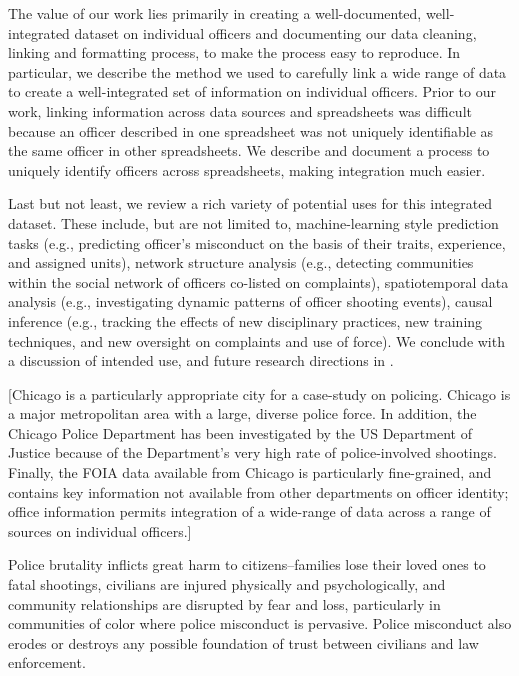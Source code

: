 The value of our work lies primarily in creating a well-documented,
well-integrated dataset on individual officers and documenting our data
cleaning, linking and formatting process, to make the process easy to
reproduce. In particular, we describe the method we used to carefully link
a wide range of data to create a well-integrated set of information on
individual officers. Prior to our work, linking information across data sources
and spreadsheets was difficult because an officer described in one spreadsheet
was not uniquely identifiable as the same officer in other spreadsheets. We
describe and document a process to uniquely identify officers across
spreadsheets, making integration much easier.

Last but not least, we review a rich variety of potential uses for this
integrated dataset. These include, but are not limited to, machine-learning
style prediction tasks (e.g., predicting officer's misconduct on the basis of
their traits, experience, and assigned units), network structure analysis
(e.g., detecting communities within the social network of officers co-listed on
complaints), spatiotemporal data analysis (e.g., investigating dynamic patterns
of officer shooting events), causal inference (e.g., tracking the effects of
new disciplinary practices, new training techniques, and new oversight on
complaints and use of force). We conclude with a discussion of intended use,
and future research directions in .

[Chicago is a particularly appropriate city for a case-study on policing.
Chicago is a major metropolitan area with a large, diverse police force. In
addition, the Chicago Police Department has been investigated by the US
Department of Justice because of the Department’s very high rate of
police-involved shootings. Finally, the FOIA data available from Chicago is
particularly fine-grained, and contains key information not available from
other departments on officer identity; office information permits integration
of a wide-range of data across a range of sources on individual officers.]

\iffalse
Police brutality inflicts great harm to citizens--families lose their loved
ones to fatal shootings, civilians are injured physically and psychologically,
and community relationships are disrupted by fear and loss, particularly in
communities of color where police misconduct is pervasive. Police misconduct
also erodes or destroys any possible foundation of trust between civilians and
law enforcement. 

